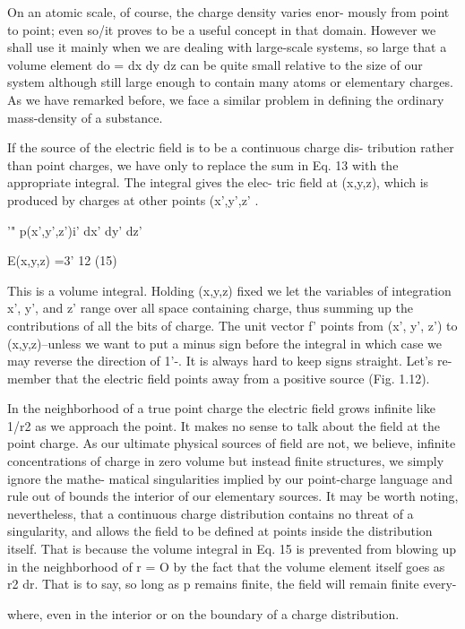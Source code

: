 On an atomic scale, of course, the charge density varies enor-
mously from point to point; even so/it proves to be a useful concept
in that domain. However we shall use it mainly when we are dealing
with large-scale systems, so large that a volume element do =
dx dy dz can be quite small relative to the size of our system although
still large enough to contain many atoms or elementary charges.
As we have remarked before, we face a similar problem in defining
the ordinary mass-density of a substance.

If the source of the electric field is to be a continuous charge dis-
tribution rather than point charges, we have only to replace the sum
in Eq. 13 with the appropriate integral. The integral gives the elec-
tric field at (x,y,z), which is produced by charges at other points
(x',y',z' .

'" p(x',y',z')i' dx' dy' dz'

E(x,y,z) =3' 12 (15)

This is a volume integral. Holding (x,y,z) fixed we let the variables
of integration x', y', and z' range over all space containing charge,
thus summing up the contributions of all the bits of charge. The
unit vector f' points from (x', y', z') to (x,y,z)--unless we want to put
a minus sign before the integral in which case we may reverse the
direction of 1'-. It is always hard to keep signs straight. Let's re-
member that the electric field points away from a positive source
(Fig. 1.12).

In the neighborhood of a true point charge the electric field grows
infinite like 1/r2 as we approach the point. It makes no sense to talk
about the field at the point charge. As our ultimate physical sources
of field are not, we believe, infinite concentrations of charge in zero
volume but instead finite structures, we simply ignore the mathe-
matical singularities implied by our point-charge language and rule
out of bounds the interior of our elementary sources. It may be
worth noting, nevertheless, that a continuous charge distribution
contains no threat of a singularity, and allows the field to be defined
at points inside the distribution itself. That is because the volume
integral in Eq. 15 is prevented from blowing up in the neighborhood
of r = O by the fact that the volume element itself goes as r2 dr. That
is to say, so long as p remains finite, the field will remain finite every-

where, even in the interior or on the boundary of a charge
distribution.


